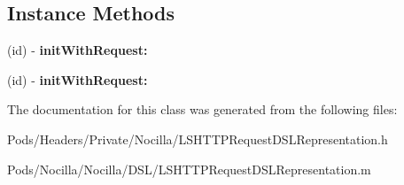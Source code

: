 \subsection*{Instance Methods}
\begin{DoxyCompactItemize}
\item 
\hypertarget{interface_l_s_h_t_t_p_request_d_s_l_representation_a2685fe7223b4c41ed37473c75b5be0d2}{(id) -\/ {\bfseries init\-With\-Request\-:}}\label{interface_l_s_h_t_t_p_request_d_s_l_representation_a2685fe7223b4c41ed37473c75b5be0d2}

\item 
\hypertarget{interface_l_s_h_t_t_p_request_d_s_l_representation_a2685fe7223b4c41ed37473c75b5be0d2}{(id) -\/ {\bfseries init\-With\-Request\-:}}\label{interface_l_s_h_t_t_p_request_d_s_l_representation_a2685fe7223b4c41ed37473c75b5be0d2}

\end{DoxyCompactItemize}


The documentation for this class was generated from the following files\-:\begin{DoxyCompactItemize}
\item 
Pods/\-Headers/\-Private/\-Nocilla/L\-S\-H\-T\-T\-P\-Request\-D\-S\-L\-Representation.\-h\item 
Pods/\-Nocilla/\-Nocilla/\-D\-S\-L/L\-S\-H\-T\-T\-P\-Request\-D\-S\-L\-Representation.\-m\end{DoxyCompactItemize}

